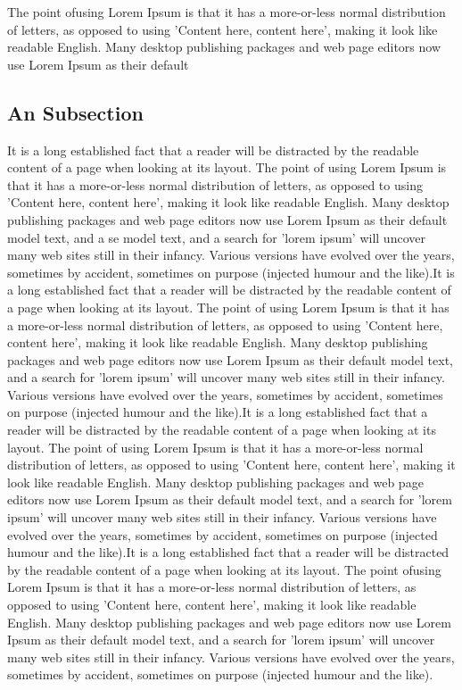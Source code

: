 The point ofusing Lorem Ipsum is that it has a more-or-less normal distribution of letters, as opposed to using 'Content here, content here', making it look like readable English. Many desktop publishing packages and web page editors now use Lorem Ipsum as their default 


\subsection{An Subsection}
It is a long established fact that a reader will be distracted by the readable content of a page when looking at its layout. The point of using Lorem Ipsum is that it has a more-or-less normal distribution of letters, as opposed to using 'Content here, content here', making it look like readable English. Many desktop publishing packages and web page editors now use Lorem Ipsum as their default model text, and a se
model text, and a search for 'lorem ipsum' will uncover many web sites still in their infancy. Various versions have evolved over the years, sometimes by accident, sometimes on purpose (injected humour and the like).It is a long established fact that a reader will be distracted by the readable content of a page when looking at its layout. The point of using Lorem Ipsum is that it has a more-or-less normal distribution of letters, as opposed to using 'Content here, content here', making it look like readable English. Many desktop publishing packages and web page editors now use Lorem Ipsum as their default model text, and a search for 'lorem ipsum' will uncover many web sites still in their infancy. Various versions have evolved over the years, sometimes by accident, sometimes on purpose (injected humour and the like).It is a long established fact that a reader will be distracted by the readable content of a page when looking at its layout. The point of using Lorem Ipsum is that it has a more-or-less normal distribution of letters, as opposed to using 'Content here, content here', making it look like readable English. Many desktop publishing packages and web page editors now use Lorem Ipsum as their default model text, and a search for 'lorem ipsum' will uncover many web sites still in their infancy. Various versions have evolved over the years, sometimes by accident, sometimes on purpose (injected humour and the like).It is a long established fact that a reader will be distracted by the readable content of a page when looking at its layout. 
The point ofusing Lorem Ipsum is that it has a more-or-less normal distribution of letters, as opposed to using 'Content here, content here', making it look like readable English. Many desktop publishing packages and web page editors now use Lorem Ipsum as their default model text, and a search for 'lorem ipsum' will uncover many web sites still in their infancy. Various versions have evolved over the years, sometimes by accident, sometimes on purpose (injected humour and the like).